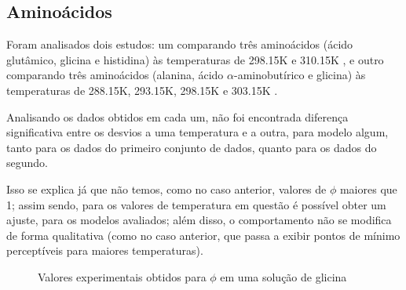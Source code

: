 \documentclass[
	12pt,				%
	openright,
	twoside,
	a4paper,			%
	english,			%
	french,				%
	spanish,			%
	brazil				%
	]{abntex2}
\begin{document}
\subsection{Aminoácidos}

Foram analisados dois estudos: um comparando três aminoácidos (ácido glutâmico,
glicina e histidina) às temperaturas de 298.15K e 310.15K \cite{tsurko2007}, e
outro comparando três aminoácidos (alanina, ácido $\alpha$-aminobutírico e glicina)
às temperaturas de 288.15K, 293.15K, 298.15K e 303.15K \cite{romero2006}.

Analisando os dados obtidos em cada um, não foi encontrada diferença significativa
entre os desvios a uma temperatura e a outra, para modelo algum, tanto para os
dados do primeiro conjunto de dados, quanto para os dados do segundo.

Isso se explica já que não temos, como no caso anterior, valores de $\phi$ maiores
que 1; assim sendo, para os valores de temperatura em questão é possível obter
um ajuste, para os modelos avaliados; além disso, o comportamento não se modifica
de forma qualitativa (como no caso anterior, que passa a exibir pontos de mínimo
perceptíveis para maiores temperaturas).

\begin{figure}[h]
	\centering
	\caption{Valores experimentais obtidos para $\phi$ em uma solução de glicina}
	\label{fig_temp_amins}
\end{figure}
\end{document}
